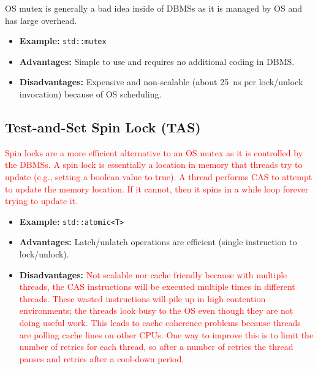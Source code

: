 \documentclass[11pt]{article}
\newcommand{\rr}[1]{\textcolor{red}{#1}}
\begin{document}
OS mutex is generally a bad idea inside of DBMSs as it is managed by OS and has large overhead.

\begin{itemize}
    \item \textbf{Example:} \texttt{std::mutex}

    \item \textbf{Advantages:} Simple to use and requires no additional coding in DBMS.

    \item \textbf{Disadvantages:} Expensive and non-scalable (about 25~ns per lock/unlock invocation) because of OS scheduling.
\end{itemize}

\subsection*{Test-and-Set Spin Lock (TAS)}
\rr{Spin locks are a more efficient alternative to an OS mutex as it is controlled by the DBMSs. A spin lock is essentially a location in memory that threads try to update (e.g., setting a boolean value to true). A thread performs CAS to attempt to update the memory location. If it cannot, then it spins in a while loop forever trying to update it.}
\begin{itemize}
    \item \textbf{Example:} \texttt{std::atomic<T>}
    
    \item \textbf{Advantages:} Latch/unlatch operations are efficient (single instruction to lock/unlock).
    
    \item \textbf{Disadvantages: }
    \rr{Not scalable nor cache friendly because with multiple threads, the CAS instructions will be executed multiple times in different threads. These wasted instructions will pile up in high contention environments; the threads look busy to the OS even though they are not doing useful work. This leads to cache coherence problems because threads are polling cache lines on other CPUs.
    One way to improve this is to limit the number of retries for each thread, so after a number of retries the thread pauses and retries after a cool-down period.}
\end{itemize}

\end{document}

